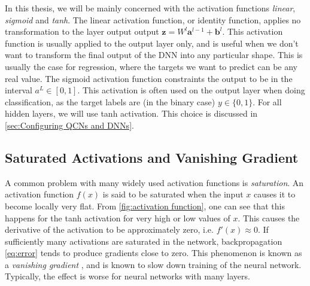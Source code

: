 In this thesis, we will be mainly concerned with the activation functions \emph{linear}, \emph{sigmoid} and \emph{tanh}. The linear activation function, or identity function, applies no transformation to the layer output output $\boldsymbol{z} = W^l \boldsymbol{a}^{l-1} + \boldsymbol{b}^l$. This activation function is usually applied to the output layer only, and is useful when we don't want to transform the final output of the DNN into any particular shape. This is usually the case for regression, where the targets we want to predict can be any real value. The sigmoid activation function constraints the output to be in the interval $a^L \in [0, 1]$. This activation is often used on the output layer when doing classification, as the target labels are (in the binary case) $y \in \{0,1\}$. For all hidden layers, we will use tanh activation. This choice is discussed in \cref{sec:Configuring QCNs and DNNs}.

\subsection{Saturated Activations and Vanishing Gradient}\label{sec:Saturated Activations and Vanishing Gradient}

A common problem with many widely used activation functions is \emph{saturation}. An activation function $f(x)$ is said to be saturated when the input $x$ causes it to become locally very flat. From \cref{fig:activation function}, one can see that this happens for the tanh activation for very high or low values of $x$. This causes the derivative of the activation to be approximately zero, i.e. $f'(x) \approx 0$. If sufficiently many activations are saturated in the network, backpropagation \cref{eq:error} tends to produce gradients close to zero. This phenomenon is known as a \emph{vanishing gradient} \cite{shalevshwartz2017failures}, and is known to slow down training of the neural network. Typically, the effect is worse for neural networks with many layers.


